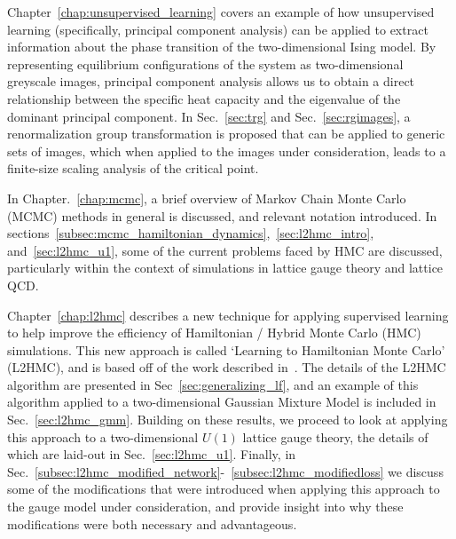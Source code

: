 \documentclass[../main.tex]{subfiles}
\begin{document}
Chapter~\ref{chap:unsupervised_learning} covers an example of how unsupervised
learning (specifically, principal component analysis) can be applied to extract
information about the phase transition of the two-dimensional Ising
model.
%
By representing equilibrium configurations of the system as two-dimensional
greyscale images, principal component analysis allows us to obtain a direct
relationship between the specific heat capacity and the eigenvalue of the
dominant principal component.
%
In Sec.~\ref{sec:trg} and Sec.~\ref{sec:rgimages}, a renormalization group
transformation is proposed that can be applied to generic sets of images, which
when applied to the images under consideration, leads to a finite-size scaling
analysis of the critical point.

In Chapter.~\ref{chap:mcmc}, a brief overview of Markov Chain Monte Carlo
(MCMC) methods in general is discussed, and relevant notation introduced.
%
In sections~\ref{subsec:mcmc_hamiltonian_dynamics},~\ref{sec:l2hmc_intro},
and~\ref{sec:l2hmc_u1}, some of the current problems faced by HMC are
discussed, particularly within the context of simulations in lattice gauge
theory and lattice QCD.

Chapter~\ref{chap:l2hmc} describes a new technique for applying supervised
learning to help improve the efficiency of Hamiltonian / Hybrid Monte Carlo
(HMC) simulations.
%
This new approach is called `Learning to Hamiltonian Monte Carlo' (L2HMC), and
is based off of the work described in~\cite{2017arXiv171109268L}.
%
%
The details of the L2HMC algorithm are presented in
Sec~\ref{sec:generalizing_lf}, and an example of this algorithm applied to a
two-dimensional Gaussian Mixture Model is included in Sec.~\ref{sec:l2hmc_gmm}.
%
Building on these results, we proceed to look at applying this approach to a
two-dimensional $U(1)$ lattice gauge theory, the details of which are laid-out
in Sec.~\ref{sec:l2hmc_u1}.
%
Finally, in
Sec.~\ref{subsec:l2hmc_modified_network}-~\ref{subsec:l2hmc_modifiedloss} we
discuss some of the modifications that were introduced when applying this
approach to the gauge model under consideration, and provide insight into why
these modifications were both necessary and advantageous.
\end{document}
